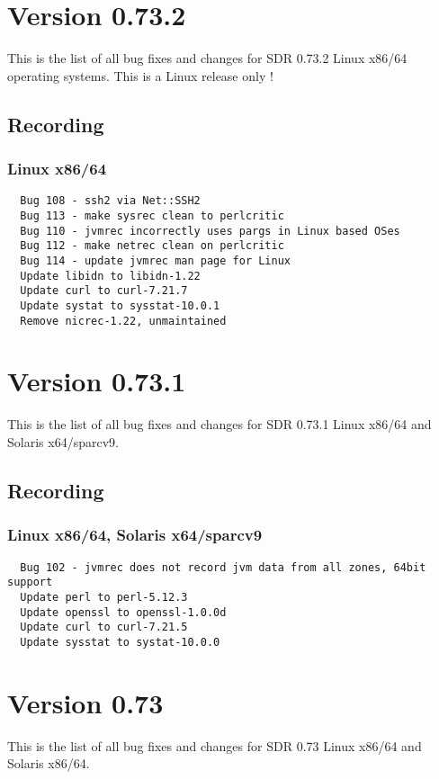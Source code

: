 \section{Version 0.73.2}
\noindent
This is the list of all bug fixes and changes for SDR 0.73.2 Linux x86/64
operating systems. This is a Linux release only !

\subsection*{Recording}
\subsubsection*{Linux x86/64}

\begin{verbatim}
  Bug 108 - ssh2 via Net::SSH2
  Bug 113 - make sysrec clean to perlcritic
  Bug 110 - jvmrec incorrectly uses pargs in Linux based OSes
  Bug 112 - make netrec clean on perlcritic
  Bug 114 - update jvmrec man page for Linux
  Update libidn to libidn-1.22
  Update curl to curl-7.21.7
  Update systat to sysstat-10.0.1
  Remove nicrec-1.22, unmaintained
\end{verbatim}



\section{Version 0.73.1}
\noindent
This is the list of all bug fixes and changes for SDR 0.73.1 Linux x86/64
and Solaris x64/sparcv9.

\subsection*{Recording}
\subsubsection*{Linux x86/64, Solaris x64/sparcv9}

\begin{verbatim}
  Bug 102 - jvmrec does not record jvm data from all zones, 64bit support
  Update perl to perl-5.12.3
  Update openssl to openssl-1.0.0d
  Update curl to curl-7.21.5
  Update sysstat to systat-10.0.0
\end{verbatim}


\section{Version 0.73}
\noindent
This is the list of all bug fixes and changes for SDR 0.73 Linux x86/64
and Solaris x86/64.

